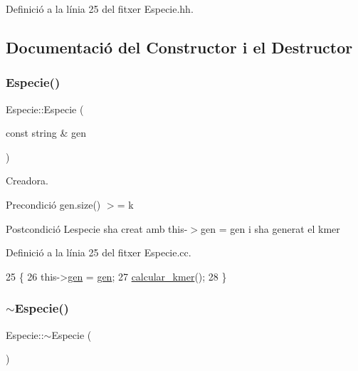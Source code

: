 Definició a la línia 25 del fitxer Especie.\+hh.



\subsection{Documentació del Constructor i el Destructor}
\mbox{\label{class_especie_a597cfbcc08d584338ffe2f5105f9e9c1}} 
\subsubsection{\texorpdfstring{Especie()}{Especie()}}
{\footnotesize\ttfamily Especie\+::\+Especie (\begin{DoxyParamCaption}\item[{const string \&}]{gen }\end{DoxyParamCaption})}



Creadora. 

\begin{DoxyPrecond}{Precondició}
gen.\+size() $>$= k 
\end{DoxyPrecond}
\begin{DoxyPostcond}{Postcondició}
L\textquotesingle{}especie s\textquotesingle{}ha creat amb this-\/$>$gen = gen i s\textquotesingle{}ha generat el kmer 
\end{DoxyPostcond}


Definició a la línia 25 del fitxer Especie.\+cc.


\begin{DoxyCode}
25                                  \{
26     this->\hyperlink{class_especie_ac35bb565f7346cd6317b3a8c849456d1}{gen} = \hyperlink{class_especie_ac35bb565f7346cd6317b3a8c849456d1}{gen};
27     \hyperlink{class_especie_ae0e15597807d18f35773c9071c2913c8}{calcular\_kmer}();
28 \}
\end{DoxyCode}
\mbox{\label{class_especie_abd21378dde6e8348d823c6f87a1c0658}} 
\subsubsection{\texorpdfstring{$\sim$\+Especie()}{~Especie()}}
{\footnotesize\ttfamily Especie\+::$\sim$\+Especie (\begin{DoxyParamCaption}{ }\end{DoxyParamCaption})}



